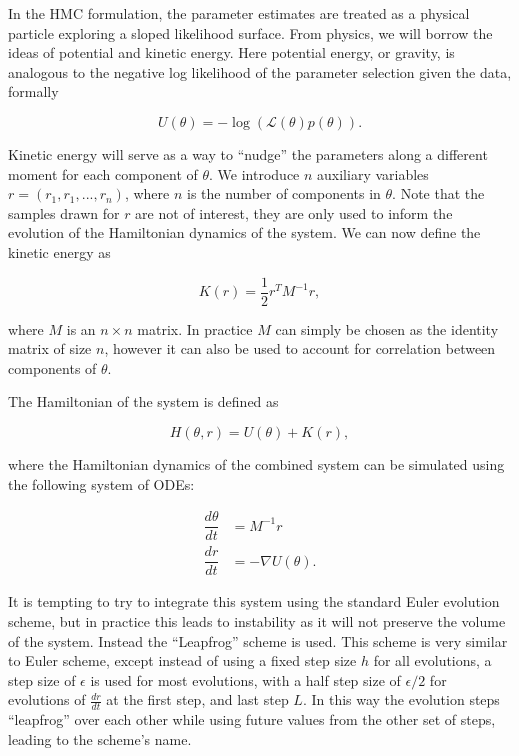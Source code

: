     In the HMC formulation, the parameter estimates are treated as a physical particle exploring a sloped likelihood surface. From physics, we will borrow the ideas of potential and kinetic energy. Here potential energy, or gravity, is analogous to the negative log likelihood of the parameter selection given the data, formally

    \begin{equation}
        U(\theta) = -\log(\mathcal{L}(\theta)p(\theta)).
    \end{equation}

    Kinetic energy will serve as a way to ``nudge'' the parameters along a different moment for each component of $\theta$. We introduce $n$ auxiliary variables $r = (r_1, r_1,...,r_n)$, where $n$ is the number of components in $\theta$. Note that the samples drawn for $r$ are not of interest, they are only used to inform the evolution of the Hamiltonian dynamics of the system. We can now define the kinetic energy as

    \begin{equation}
        K(r) = \frac{1}{2} r^T M^{-1} r,
    \end{equation}

    where $M$ is an $n \times n$ matrix. In practice $M$ can simply be chosen as the identity matrix of size $n$, however it can also be used to account for correlation between components of $\theta$.

    The Hamiltonian of the system is defined as

    \begin{equation}
        H(\theta,r) = U(\theta) + K(r),
    \end{equation}

    where the Hamiltonian dynamics of the combined system can be simulated using the following system of ODEs:

    \begin{equation}
        \begin{array}{rl}
        \displaystyle
            \dfrac{d\theta}{dt} & = M^{-1} r \\
            \dfrac{dr}{dt} & = - \nabla U(\theta) .
        \end{array}
    \end{equation}

    It is tempting to try to integrate this system using the standard Euler evolution scheme, but in practice this leads to instability as it will not preserve the volume of the system. Instead the ``Leapfrog'' scheme is used. This scheme is very similar to Euler scheme, except instead of using a fixed step size $h$ for all evolutions, a step size of $\epsilon$ is used for most evolutions, with a half step size of $\epsilon / 2$ for evolutions of $\frac{dr}{dt}$ at the first step, and last step $L$. In this way the evolution steps ``leapfrog'' over each other while using future values from the other set of steps, leading to the scheme's name.

